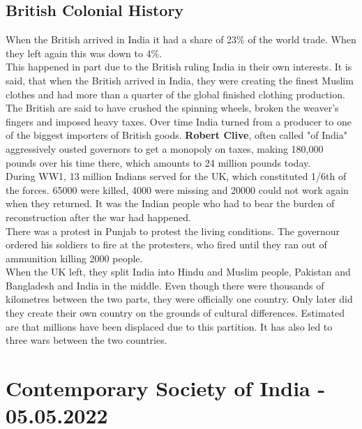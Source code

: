 \documentclass{article}
\begin{document}
	\subsection{British Colonial History}
	When the British arrived in India it had a share of 23\% of the world trade. When they left again this was down to 4\%. \\
	This happened in part due to the British ruling India in their own interests. It is said, that when the British arrived in India, they were creating the finest Muslim clothes and had more than a quarter of the global finished clothing production. The British are said to have crushed the spinning wheels, broken the weaver's fingers and imposed heavy taxes. Over time India turned from a producer to one of the biggest importers of British goods. \textbf{Robert Clive}, often called "of India" aggressively ousted governors to get a monopoly on taxes, making 180,000 pounds over his time there, which amounts to 24 million pounds today. \\
	During WW1, 13 million Indians served for the UK, which constituted 1/6th of the forces. 65000 were killed, 4000 were missing and 20000 could not work again when they returned. It was the Indian people who had to bear the burden of reconstruction after the war had happened. \\
	There was a protest in Punjab to protest the living conditions. The governour ordered his soldiers to fire at the protesters, who fired until they ran out of ammunition killing 2000 people. \\
	When the UK left, they split India into Hindu and Muslim people, Pakistan and Bangladesh and India in the middle. Even though there were thousands of kilometres between the two parts, they were officially one country. Only later did they create their own country on the grounds of cultural differences. Estimated are that millions have been displaced due to this partition. It has also led to three wars between the two countries. \\

	\section{Contemporary Society of India - 05.05.2022}
\end{document}
